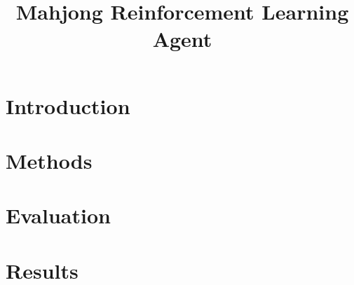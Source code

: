\documentclass{article}
\title{Mahjong Reinforcement Learning Agent}
\begin{document}
\maketitle

\section{Introduction}
\section{Methods}
\section{Evaluation}
\section{Results}
\end{document}
